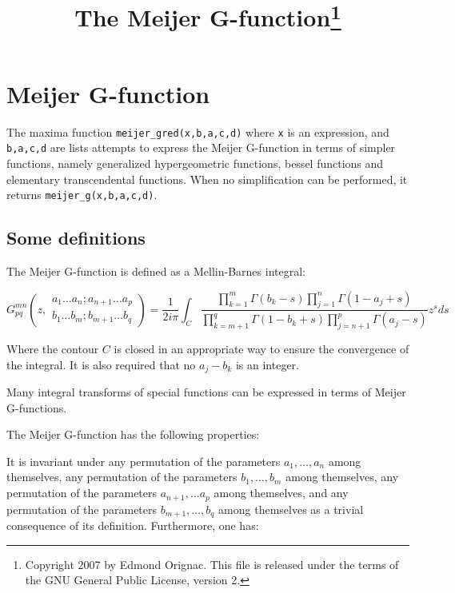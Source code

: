 \documentclass[11pt]{article}
\title{The Meijer G-function\footnote
{Copyright 2007 by Edmond Orignac.
This file is released under the terms of the GNU General Public License, version 2.}}
\begin{document}
\maketitle

\section{Meijer G-function} 

The maxima function \texttt{meijer\_gred(x,b,a,c,d)} where 
\texttt{x} is an expression, and \texttt{b,a,c,d} are lists
attempts to express the Meijer G-function in terms of simpler
functions, namely generalized hypergeometric functions, bessel
functions and elementary transcendental functions. When no 
simplification can be performed, it 
returns \texttt{meijer\_g(x,b,a,c,d)}.  


\subsection{Some definitions}

The Meijer G-function is defined as a Mellin-Barnes integral\cite{meijer1951,braaksma1962,braaksma1975}:

\begin{equation}
  \label{eq:g-function-def}
  G^{mn}_{pq}\left(z,\begin{array}{c} a_1\ldots a_n;a_{n+1} \ldots a_p \\ b_1\ldots b_m;b_{m+1} \ldots b_q \end{array} \right) = \frac 1 {2i\pi} \int_C \frac{\prod_{k=1}^m \Gamma(b_k-s) \prod_{j=1}^n \Gamma(1-a_j+s)}{\prod_{k=m+1}^q \Gamma(1-b_k+s) \prod_{j=n+1}^p \Gamma(a_j-s)} z^s ds   
\end{equation}

Where the contour $C$ is closed in an appropriate way to ensure the convergence
of the integral. It is also required that no $a_j-b_k$ is an integer. 

Many integral transforms of special functions can be expressed in terms of Meijer G-functions.\cite{maloo1966,shah1972,bajpai1968,bajpai1974,dahiya1988}

The Meijer G-function has the following properties\cite{roach1997}: 
 
It is invariant under any permutation of the parameters $a_1,\dots,a_n$ among themselves, any permutation of the parameters $b_1,\ldots, b_m$ among themselves, any permutation of the parameters $a_{n+1},\ldots a_p$ among themselves, and 
any permutation of the parameters $b_{m+1},\ldots, b_q$ among themselves as 
a trivial consequence of its definition. Furthermore, one has:  
\end{document}
